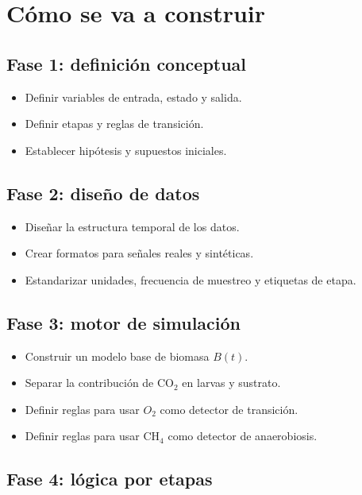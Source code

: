\documentclass[12pt,a4paper]{report}
\begin{document}
\chapter{Cómo se va a construir}

\section{Fase 1: definición conceptual}

\begin{itemize}[leftmargin=0.7cm]
    \item Definir variables de entrada, estado y salida.
    \item Definir etapas y reglas de transición.
    \item Establecer hipótesis y supuestos iniciales.
\end{itemize}

\section{Fase 2: diseño de datos}

\begin{itemize}[leftmargin=0.7cm]
    \item Diseñar la estructura temporal de los datos.
    \item Crear formatos para señales reales y sintéticas.
    \item Estandarizar unidades, frecuencia de muestreo y etiquetas de etapa.
\end{itemize}

\section{Fase 3: motor de simulación}

\begin{itemize}[leftmargin=0.7cm]
    \item Construir un modelo base de biomasa \(B(t)\).
    \item Separar la contribución de CO$_2$ en larvas y sustrato.
    \item Definir reglas para usar \(O_2\) como detector de transición.
    \item Definir reglas para usar CH$_4$ como detector de anaerobiosis.
\end{itemize}

\section{Fase 4: lógica por etapas}
\end{document}
